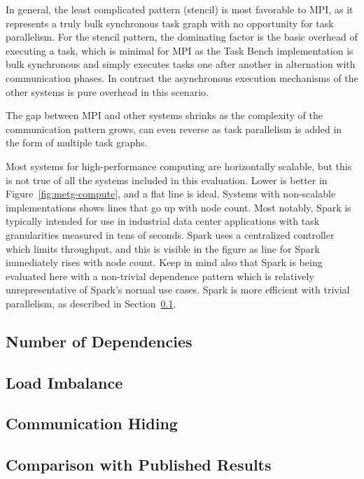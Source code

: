 In general, the least complicated pattern (stencil) is most favorable
to MPI, as it represents a truly bulk synchronous task graph with no
opportunity for task parallelism. For the stencil pattern, the
dominating factor is the basic overhead of executing a task, which is
minimal for MPI as the Task Bench implementation is bulk synchronous
and simply executes tasks one after another in alternation with
communication phases. In contrast the asynchronous execution
mechanisms of the other systems is pure overhead in this scenario.

The gap between MPI and other systems shrinks as the complexity of the
communication pattern grows, can even reverse as task parallelism is
added in the form of multiple task graphs.


Most systems for high-performance computing are horizontally scalable,
but this is not true of all the systems included in this
evaluation. Lower is better in Figure~\ref{fig:metg-compute}, and a
flat line is ideal. Systems with non-scalable implementations shows
lines that go up with node count. Most notably, Spark is typically
intended for use in industrial data center applications with task
granularities measured in tens of seconds. Spark uses a centralized
controller which limits throughput, and this is visible in the figure
as line for Spark immediately rises with node count. Keep in mind also
that Spark is being evaluated here with a non-trivial dependence
pattern which is relatively unrepresentative of Spark's normal use
cases. Spark is more efficient with trivial parallelism, as described
in Section~\ref{subsec:number-of-dependencies}.



\subsection{Number of Dependencies}
\label{subsec:number-of-dependencies}



\subsection{Load Imbalance}



\subsection{Communication Hiding}



\subsection{Comparison with Published Results}
